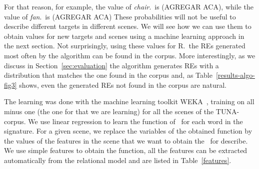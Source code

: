 For that reason, for example, the value of \emph{chair}.\puse\ is (AGREGAR ACA), while the value of \emph{fan}.\puse\ is (AGREGAR ACA)  
These probabilities will not be useful to describe different targets in different scenes. We will see how we can use them to obtain
 values for new targets and scenes using a machine learning approach in the next section. Not surprisingly, using these values for 
R.\puse\ the REs generated most often by the algorithm can be found in the corpus. More interestingly, as we discuss in 
Section~\ref{sec:evaluation} the algorithm generates REs with a distribution that matches the one found in the corpus and, 
as Table~\ref{results-algo-fig3} shows, even the generated REs not found in the corpus are natural.    


The learning was done with the machine learning toolkit WEKA~\cite{Hall:WEK09}, training on all minus one (the one for that we are learning) for all the scenes of the TUNA-corpus. We use linear regression to learn the function of \puse\ for each word in the signature. 
For a given scene, we replace the variables of the obtained function by the values of the features in the scene that we want to obtain the \puse\ for describe. 
We use simple features to obtain the function, all the features can be extracted automatically from the relational model and are listed 
in Table~\ref{features}.  

